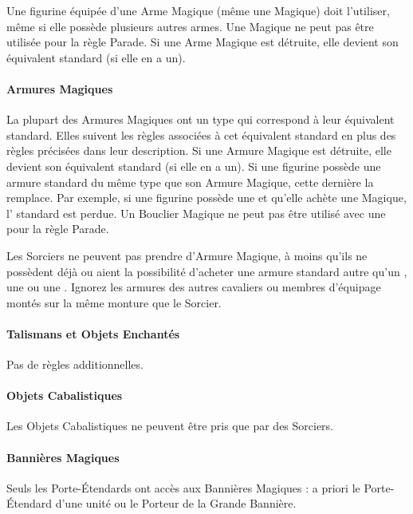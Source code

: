 Une figurine équipée d'une Arme Magique (même une \hw{} Magique) doit l'utiliser, même si elle possède plusieurs autres armes. Une \hw{} Magique ne peut pas être utilisée pour la règle Parade. Si une Arme Magique est détruite, elle devient son équivalent standard (si elle en a un).

\paragraph{Armures Magiques}

La plupart des Armures Magiques ont un type qui correspond à leur équivalent standard. Elles suivent les règles associées à cet équivalent standard en plus des règles précisées dans leur description. Si une Armure Magique est détruite, elle devient son équivalent standard (si elle en a un). Si une figurine possède une armure standard du même type que son Armure Magique, cette dernière la remplace. Par exemple, si une figurine possède une \ha{} et qu'elle achète une \la{} Magique, l'\ha{} standard est perdue. Un Bouclier Magique ne peut pas être utilisé avec une \hw{} pour la règle Parade.

Les Sorciers ne peuvent pas prendre d'Armure Magique, à moins qu'ils ne possèdent déjà ou aient la possibilité d'acheter une armure standard autre qu'un \barding{}, une \innatedefence{} ou une \mountsprotection{}. Ignorez les armures des autres cavaliers ou membres d'équipage montés sur la même monture que le Sorcier.

\paragraph{Talismans et Objets Enchantés}

Pas de règles additionnelles.

\paragraph{Objets Cabalistiques}

Les Objets Cabalistiques ne peuvent être pris que par des Sorciers.

\paragraph{Bannières Magiques}

Seuls les Porte-Étendards ont accès aux Bannières Magiques : a priori le Porte-Étendard d'une unité ou le Porteur de la Grande Bannière.

